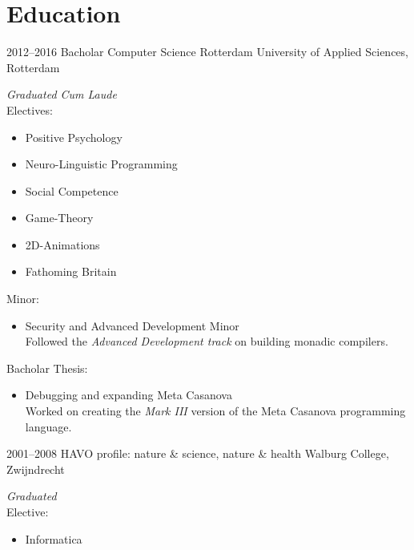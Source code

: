 \documentclass[]{friggeri-cv} %
\begin{document}

\section{Education}

\begin{entrylist}
   \entry
   {2012--2016}
   {Bacholar {\normalfont Computer Science}}
   {Rotterdam University of Applied Sciences, Rotterdam}
   {\textit{Graduated Cum Laude} \\
      Electives:
      \setlength\multicolsep{0pt}
      \begin{multicols}{2}
         \begin{itemize}[topsep=0pt]
            \item Positive Psychology
            \item Neuro-Linguistic Programming
            \item Social Competence
            \item Game-Theory
            \item 2D-Animations
            \item Fathoming Britain
         \end{itemize}
      \end{multicols}
      Minor:
      \begin{itemize}[topsep=0pt]
         \item Security and Advanced Development Minor\\
            Followed the \textit{Advanced Development track} on building monadic compilers.
      \end{itemize}
      Bacholar Thesis:
      \begin{itemize}[topsep=0pt]
         \item Debugging and expanding Meta Casanova\\
            Worked on creating the \textit{Mark III} version of the Meta Casanova programming language.
      \end{itemize}
   }
   \entry
   {2001--2008}
   {HAVO {\normalfont profile: nature \& science, nature \& health}}
   {Walburg College, Zwijndrecht}
   {\textit{Graduated} \\
      Elective:
      \begin{itemize}[topsep=0pt]
         \item Informatica
      \end{itemize}
   }
\end{entrylist}
\end{document}
